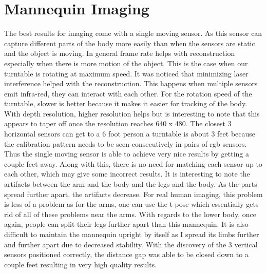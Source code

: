 \section{Mannequin Imaging}
The best results for imaging come with a single moving sensor. As this sensor can capture different parts of the body more easily than when the sensors are static and the object is moving. In general frame rate helps with reconstruction especially when there is more motion of the object. This is the case when our turntable is rotating at maximum speed. It was noticed that minimizing laser interference helped with the reconstruction. This happens when multiple sensors emit infra-red, they can interact with each other. For the rotation speed of the turntable, slower is better because it makes it easier for tracking of the body. With depth resolution, higher resolution helps but is interesting to note that this appears to taper off once the resolution reaches 640 x 480. The closest 3 horizontal sensors can get to a 6 foot person a turntable is about 3 feet because the calibration pattern needs to be seen consecutively in pairs of rgb sensors. Thus the single moving sensor is able to achieve very nice results by getting a couple feet away. Along with this, there is no need for matching each sensor up to each other, which may give some incorrect results. It is interesting to note the artifacts between the arm and the body and the legs and the body. As the parts spread further apart, the artifacts decrease. For real human imaging, this problem is less of a problem as for the arms, one can use the t-pose which essentially gets rid of all of these problems near the arms. With regards to the lower body, once again, people can split their legs further apart than this mannequin. It is also difficult to maintain the mannequin upright by itself as I spread its limbs further and further apart due to decreased stability. With the discovery of the 3 vertical sensors positioned correctly, the distance gap was able to be closed down to a couple feet resulting in very high quality results.

